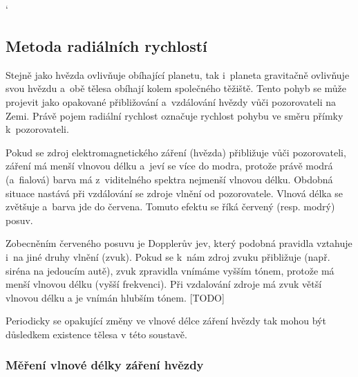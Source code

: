 \documentclass[a4paper,12pt]{article}
\begin{document}
{ %
\catcode`


\clearpage
\subsection{Metoda radiálních rychlostí}

Stejně jako hvězda ovlivňuje obíhající planetu, tak i~planeta gravitačně ovlivňuje svou hvězdu a~obě tělesa obíhají kolem společného těžiště. Tento pohyb se může projevit jako opakované přibližování a~vzdálování hvězdy vůči pozorovateli na Zemi. Právě pojem radiální rychlost označuje rychlost pohybu ve směru přímky k~pozorovateli.~\cite{methods}

Pokud se zdroj elektromagnetického záření (hvězda) přibližuje vůči pozorovateli, záření má menší vlnovou délku a~jeví se více do modra, protože právě modrá (a~fialová) barva má z~viditelného spektra nejmenší vlnovou délku. Obdobná situace nastává při vzdálování se zdroje vlnění od pozorovatele. Vlnová délka se zvětšuje a~barva jde do červena. Tomuto efektu se říká červený (resp. modrý) posuv.~\cite{methods}

\drawgimp

Zobecněním červeného posuvu je Dopplerův jev, který podobná pravidla vztahuje i~na jiné druhy vlnění (zvuk). Pokud se k~nám zdroj zvuku přibližuje (např. siréna na jedoucím autě), zvuk zpravidla vnímáme vyšším tónem, protože má menší vlnovou délku (vyšší frekvenci). Při vzdalování zdroje má zvuk větší vlnovou délku a je vnímán hlubším tónem. [TODO]

Periodicky se opakující změny ve vlnové délce záření hvězdy tak mohou být důsledkem existence tělesa v této soustavě.~\cite{methods}

\subsubsection{Měření vlnové délky záření hvězdy}

}
\end{document}
